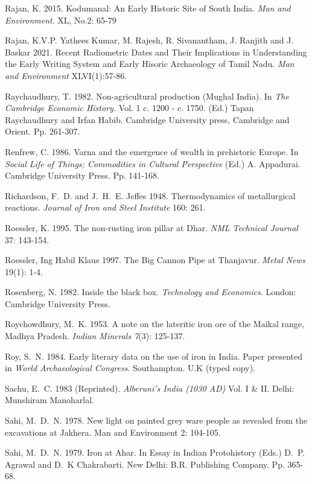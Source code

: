 \begin{thebibliography}{99}
 Rajan, K. 2015. Kodumanal: An Early Historic Site of South India. \textit{Man and Environment}. XL, No.2: 65-79

Rajan, K.V.P. Yathees Kumar, M. Rajesh, R. Sivanantham, J. Ranjith and J. Baskar 2021. Recent Radiometric Dates and Their Implications in Understanding the Early Writing System and Early Hisoric Archaeology of Tamil Nadu. \textit{Man and Environment} XLVI(1):57-86.

 Raychaudhury, T. 1982. Non-agricultural production (Mughal India). In \textit{The Cambridge Economic History.} Vol. 1 c. 1200 - c. 1750. (Ed.) Tapan Raychaudhury and Irfan Habib. Cambridge University press, Cambridge and Orient. Pp. 261-307.

 Renfrew, C. 1986. Varna and the emergence of wealth in prehistoric Europe. In \textit{Social Life of Things; Commodities in Cultural Perspective} (Ed.) A. Appadurai. Cambridge University Press. Pp. 141-168. 

 Richardson, F.~D. and J.~H.~E. Jeffes 1948. Thermodynamics of metallurgical reactions. \textit{Journal of Iron and Steel Institute} 160:  261.

 Roessler, K. 1995. The non-rusting iron pillar at Dhar. \textit{NML Technical Journal} 37: 143-154. 

 Roessler, Ing Habil Klaus 1997. The Big Cannon Pipe at Thanjavur. \textit{Metal News} 19(1): 1-4. 

 Rosenberg, N. 1982. Inside the black box. \textit{Technology and Economics}. London: Cambridge University Press.

 Roychowdhury, M.~K. 1953. A note on the lateritic iron ore of the Maikal range, Madhya Pradesh. \textit{Indian Minerals 7}(3): 125-137.

 Roy, S.~N. 1984. Early literary data on the use of iron in India. Paper presented in \textit{World Archaeological Congress}. Southampton. U.K (typed copy).

 Sachu, E.~C. 1983 (Reprinted). \textit{Alberuni's India (1030 AD)} Vol. I \& II. Delhi: Munshiram Manoharlal.

 Sahi, M.~D.~N. 1978. New light on painted grey ware people as revealed from the excavations at Jakhera. Man and Environment 2: 104-105. 

 Sahi, M.~D.~N. 1979. Iron at Ahar. In Essay in Indian Protohistory (Eds.) D.~P. Agrawal and D.~K Chakrabarti. New Delhi: B.R. Publishing Company. Pp. 365-68.


\end{thebibliography}
